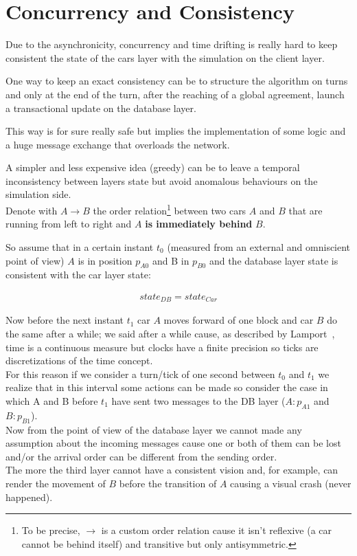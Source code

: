 \section{Concurrency and Consistency}

Due to the asynchronicity, concurrency and time drifting is really hard 
to keep consistent the state of the cars layer with the simulation 
on the client layer. 

One way to keep an exact consistency can be to structure the algorithm on 
turns and only at the end of the turn, after the reaching of a global agreement,
launch a transactional update on the database layer. 

This way is for sure really safe but implies the implementation of some logic 
and a huge message exchange that overloads the network.

A simpler and less expensive idea (greedy) can be to leave a temporal inconsistency between 
layers state but avoid anomalous behaviours on the simulation side. \\

\noindent
Denote with $A \rightarrow B$ the order relation\footnote{
    To be precise, $\rightarrow$ is a custom order relation cause it isn't 
    reflexive (a car cannot be behind itself) and transitive but only antisymmetric.
} between two cars $A$ and $B$ that are running from left to right and $A$ 
\textbf{is immediately behind} $B$. 

So assume that in a certain instant $t_0$ 
(measured from an external and omniscient point of view) 
$A$ is in position $p_{A0}$ and B in $p_{B0}$ and 
the database layer state is consistent with the car layer state:

\begin{equation}\begin{split}
    state_{DB} = state_{Car}
\end{split}\end{equation} 

\noindent
Now before the next instant $t_1$ car $A$ moves forward of one block and car $B$
do the same after a while; we said after a while cause, as described by Lamport~\cite{Lamport:1978},
time is a continuous measure but clocks have a finite precision so 
ticks are discretizations of the time concept.\\
\indent
For this reason if we consider a turn/tick 
of one second between $t_0$ and $t_1$ we realize that in this interval some 
actions can be made so consider the case in which A and B before $t_1$ 
have sent two messages to the DB layer ($A:p_{A1}$ and $B:p_{B1}$).\\
\indent
Now from the point of view of the database layer we cannot made any assumption 
about the incoming messages cause one or both of them can be lost and/or the 
arrival order can be different from the sending order. \\
\indent
The more the third layer cannot have a consistent vision and, for example, 
can render the movement of $B$ before the transition of $A$ causing 
a visual crash (never happened).\\

